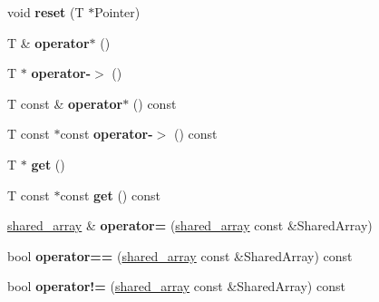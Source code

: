 \begin{DoxyCompactItemize}
\item 
\hypertarget{classgli_1_1shared__array_a02c1f5e720a13897957664858463e4ac}{void {\bfseries reset} (\-T $\ast$\-Pointer)}\label{classgli_1_1shared__array_a02c1f5e720a13897957664858463e4ac}

\item 
\hypertarget{classgli_1_1shared__array_a81704ff642ba50bce9d5cb27288fb6cc}{\-T \& {\bfseries operator$\ast$} ()}\label{classgli_1_1shared__array_a81704ff642ba50bce9d5cb27288fb6cc}

\item 
\hypertarget{classgli_1_1shared__array_a9e71ca750a19f94c857d4a3ff471acc6}{\-T $\ast$ {\bfseries operator-\/$>$} ()}\label{classgli_1_1shared__array_a9e71ca750a19f94c857d4a3ff471acc6}

\item 
\hypertarget{classgli_1_1shared__array_a2682085648bb6c3e70809e11dd406a4c}{\-T const \& {\bfseries operator$\ast$} () const }\label{classgli_1_1shared__array_a2682085648bb6c3e70809e11dd406a4c}

\item 
\hypertarget{classgli_1_1shared__array_a87a61fcafc05c3868b80c2b8968a3330}{\-T const $\ast$const {\bfseries operator-\/$>$} () const }\label{classgli_1_1shared__array_a87a61fcafc05c3868b80c2b8968a3330}

\item 
\hypertarget{classgli_1_1shared__array_a22e305684618ed47f61e41babbd2f999}{\-T $\ast$ {\bfseries get} ()}\label{classgli_1_1shared__array_a22e305684618ed47f61e41babbd2f999}

\item 
\hypertarget{classgli_1_1shared__array_a91f4f323dc93a13751572193c545383a}{\-T const $\ast$const {\bfseries get} () const }\label{classgli_1_1shared__array_a91f4f323dc93a13751572193c545383a}

\item 
\hypertarget{classgli_1_1shared__array_aeda049ebedd90b583400f1854d5bbc9b}{\hyperlink{classgli_1_1shared__array}{shared\-\_\-array} \& {\bfseries operator=} (\hyperlink{classgli_1_1shared__array}{shared\-\_\-array} const \&\-Shared\-Array)}\label{classgli_1_1shared__array_aeda049ebedd90b583400f1854d5bbc9b}

\item 
\hypertarget{classgli_1_1shared__array_aa9285c927e76ca392ef8e5501f4297e2}{bool {\bfseries operator==} (\hyperlink{classgli_1_1shared__array}{shared\-\_\-array} const \&\-Shared\-Array) const }\label{classgli_1_1shared__array_aa9285c927e76ca392ef8e5501f4297e2}

\item 
\hypertarget{classgli_1_1shared__array_a264bbbd47660940c332414a8fea949be}{bool {\bfseries operator!=} (\hyperlink{classgli_1_1shared__array}{shared\-\_\-array} const \&\-Shared\-Array) const }\label{classgli_1_1shared__array_a264bbbd47660940c332414a8fea949be}

\end{DoxyCompactItemize}

